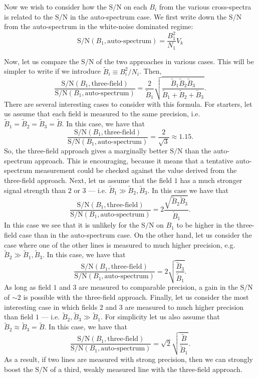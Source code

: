\documentclass{aastex62}
\newcommand{\beq}{\begin{equation}}
\newcommand{\eeq}{\end{equation}}
\newcommand{\SN}{\ensuremath{\text{S}/\text{N}}}
\begin{document}
Now we wish to consider how the \SN{} on each $B_i$ from the various
cross-spectra is related to the \SN{} in the auto-spectrum case. We first
write down the \SN{} from the auto-spectrum in the white-noise dominated
regime:
\beq \label{eq:autops_sn_wn}
\SN(B_1, \text{auto-spectrum}) = \frac{B_1^2}{N_1} V_k
\eeq

Now, let us compare the \SN{} of the two approaches in various cases. This
will be simpler to write if we introduce $\tilde{B}_i \equiv B_i^2/N_i$. Then,
\beq
\frac{\SN(B_1, \text{three-field})}{\SN(B_1, \text{auto-spectrum})} =
\frac{2}{\tilde{B}_1}
\sqrt{\frac{\tilde{B}_1\tilde{B}_2\tilde{B}_3}{\tilde{B}_1 + \tilde{B}_2 + \tilde{B}_3}}
\text{.}
\eeq
There are several interesting cases to consider with this formula. For
starters, let us assume that each field is measured to the same precision,
i.e. $\tilde{B}_1 = \tilde{B}_2 = \tilde{B}_3 = \tilde{B}$. In this case, we
have that
\beq
\frac{\SN(B_1, \text{three-field})}{\SN(B_1, \text{auto-spectrum})} =
\frac{2}{\sqrt{3}} \approx 1.15
\text{.}
\eeq
So, the three-field approach gives a marginally better \SN{} than the
auto-spectrum approach. This is encouraging, because it means that a tentative
auto-spectrum measurement could be checked against the value derived from the
three-field approach. Next, let us assume that the field $1$ has a much
stronger signal strength than $2$ or $3$ --- i.e. $\tilde{B}_1 \gg
\tilde{B}_2,\tilde{B}_3$. In this case we have that
\beq
\frac{\SN(B_1, \text{three-field})}{\SN(B_1, \text{auto-spectrum})} =
2\frac{\sqrt{\tilde{B}_2\tilde{B}_3}}{\tilde{B}_1}\text{.}
\eeq
In this case we see that it is unlikely for the $\text{S}/\text{N}$ on $B_1$
to be higher in the three-field case than in the auto-spectrum case. On the
other hand, let us consider the case where one of the other lines is measured
to much higher precision, e.g. $\tilde{B}_2 \gg \tilde{B}_1,\tilde{B}_3$. In
this case, we have that
\beq
\frac{\SN(B_1, \text{three-field})}{\SN(B_1, \text{auto-spectrum})} =
2\sqrt{\frac{\tilde{B}_3}{\tilde{B}_1}}\text{.}
\eeq
As long as field $1$ and $3$ are measured to comparable precision, a gain in
the \SN{} of $\sim2$ is possible with the three-field approach. Finally, let
us consider the most interesting case in which fields $2$ and $3$ are measured
to much higher precision than field $1$ --- i.e. $\tilde{B}_2, \tilde{B}_3 \gg
\tilde{B}_1$. For simplicity let us also assume that $\tilde{B}_2 \approx
\tilde{B}_3 = \tilde{B}$. In this case, we have that
\beq
\frac{\SN(B_1, \text{three-field})}{\SN(B_1, \text{auto-spectrum})} =
\sqrt{2}\sqrt{\frac{\tilde{B}}{\tilde{B}_1}}
\text{.}
\eeq
As a result, if two lines are measured with strong precision, then we can
strongly boost the \SN{} of a third, weakly measured line with the three-field
approach.
\end{document}
